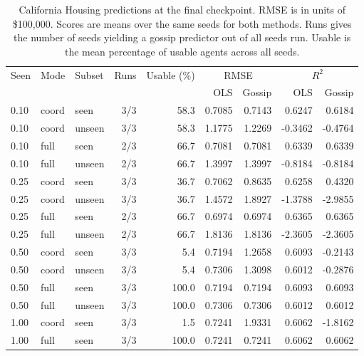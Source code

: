 \begin{table}[htbp]\centering\small
\caption{California Housing predictions at the final checkpoint. RMSE is in units of \$100,000. Scores are means over the same seeds for both methods. Runs gives the number of seeds yielding a gossip predictor out of all seeds run. Usable is the mean percentage of usable agents across all seeds.}
\label{tab:ca-paired-predictions}\begin{tabular}{lllrrrrrr}\hline
Seen & Mode & Subset & Runs & Usable (\%) & \multicolumn{2}{c}{RMSE} & \multicolumn{2}{c}{$R^2$} \\
 & & & & & OLS & Gossip & OLS & Gossip \\ \hline
0.10 & coord & seen & 3/3 & 58.3 & 0.7085 & 0.7143 & 0.6247 & 0.6184 \\
0.10 & coord & unseen & 3/3 & 58.3 & 1.1775 & 1.2269 & -0.3462 & -0.4764 \\
0.10 & full & seen & 2/3 & 66.7 & 0.7081 & 0.7081 & 0.6339 & 0.6339 \\
0.10 & full & unseen & 2/3 & 66.7 & 1.3997 & 1.3997 & -0.8184 & -0.8184 \\
0.25 & coord & seen & 3/3 & 36.7 & 0.7062 & 0.8635 & 0.6258 & 0.4320 \\
0.25 & coord & unseen & 3/3 & 36.7 & 1.4572 & 1.8927 & -1.3788 & -2.9855 \\
0.25 & full & seen & 2/3 & 66.7 & 0.6974 & 0.6974 & 0.6365 & 0.6365 \\
0.25 & full & unseen & 2/3 & 66.7 & 1.8136 & 1.8136 & -2.3605 & -2.3605 \\
0.50 & coord & seen & 3/3 & 5.4 & 0.7194 & 1.2658 & 0.6093 & -0.2143 \\
0.50 & coord & unseen & 3/3 & 5.4 & 0.7306 & 1.3098 & 0.6012 & -0.2876 \\
0.50 & full & seen & 3/3 & 100.0 & 0.7194 & 0.7194 & 0.6093 & 0.6093 \\
0.50 & full & unseen & 3/3 & 100.0 & 0.7306 & 0.7306 & 0.6012 & 0.6012 \\
1.00 & coord & seen & 3/3 & 1.5 & 0.7241 & 1.9331 & 0.6062 & -1.8162 \\
1.00 & full & seen & 3/3 & 100.0 & 0.7241 & 0.7241 & 0.6062 & 0.6062 \\
\hline\end{tabular}\end{table}
